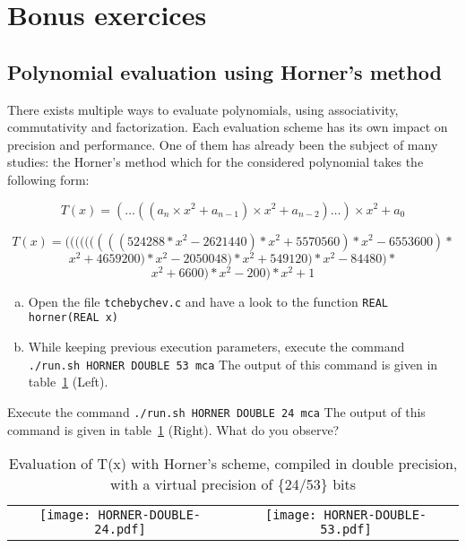 \section{Bonus exercices}
\subsection{Polynomial evaluation using Horner's method}

There exists multiple ways to evaluate polynomials, using associativity, commutativity and factorization.
Each evaluation scheme has its own impact on precision and performance.
One of them has already been the subject of many studies: the Horner's method which for the considered polynomial takes the following form:

\[
  T(x) = (\dots((a_n\times x^2 + a_{n-1})\times x^2 + a_{n-2})\dots) \times x^2
  + a_0
\]

$$T(x) = (((((((((524288*x^2-2621440)*x^2+5570560)*x^2-6553600)*$$
$$x^2+4659200)*x^2-2050048)*x^2+549120)*x^2-84480)*$$
$$x^2+6600)*x^2-200)*x^2+1$$

\begin{question}
  \begin{enumerate}[(a)]
    \item Open the file {\tt tchebychev.c} and have a look to the function {\tt REAL horner(REAL x)}
    \item While keeping previous execution parameters, execute the command {\tt ./run.sh HORNER DOUBLE 53 mca}  \newline The output of this command is given in table~\ref{fig:hor_24_53} (Left).
  \end{enumerate}
\end{question}

\begin{question}
  \item Execute the command {\tt ./run.sh HORNER DOUBLE 24 mca}  \newline
  The output of this command is given in table~\ref{fig:hor_24_53} (Right).
  What do you observe?
\end{question}

\begin{table}
  \begin{tabular}{cc}
    \texttt{[image: HORNER-DOUBLE-24.pdf]} &
    \texttt{[image: HORNER-DOUBLE-53.pdf]}   \\
  \end{tabular}
  \caption{Evaluation of T(x) with Horner's scheme, compiled in double precision, with a virtual precision of \{24/53\} bits}
  \label{fig:hor_24_53}
\end{table}



